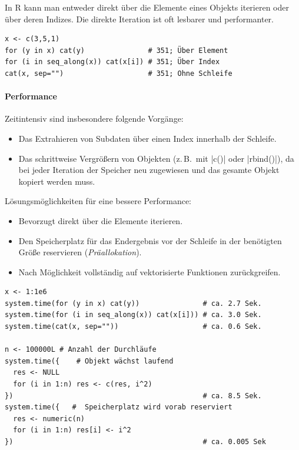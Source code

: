 \documentclass[10pt,twocolumn]{scrartcl}
\renewcommand{\lstinline}{\mycoloredinline}
\begin{document}
In R kann man entweder direkt über die Elemente eines Objekts iterieren oder über deren Indizes. Die direkte Iteration ist oft lesbarer und performanter.

\begin{lstlisting}
x <- c(3,5,1)
for (y in x) cat(y)               # 351; Über Element
for (i in seq_along(x)) cat(x[i]) # 351; Über Index
cat(x, sep="")                    # 351; Ohne Schleife
\end{lstlisting}


\paragraph{Performance}

Zeitintensiv sind insbesondere folgende Vorgänge:

\begin{itemize}
\item Das Extrahieren von Subdaten über einen Index innerhalb der Schleife.
\item Das schrittweise Vergrößern von Objekten (z.\,B.\ mit \lstinline|c()| oder \lstinline|rbind()|), da bei jeder Iteration der Speicher neu zugewiesen und das gesamte Objekt kopiert werden muss.
\end{itemize}

Lösungsmöglichkeiten für eine bessere Performance:

\begin{itemize}
\item Bevorzugt direkt über die Elemente iterieren.
\item Den Speicherplatz für das Endergebnis vor der Schleife in der benötigten Größe reservieren (\emph{Präallokation}).
\item Nach Möglichkeit vollständig auf vektorisierte Funktionen zurückgreifen.
\end{itemize}

\begin{lstlisting}
x <- 1:1e6
system.time(for (y in x) cat(y))               # ca. 2.7 Sek.
system.time(for (i in seq_along(x)) cat(x[i])) # ca. 3.0 Sek.
system.time(cat(x, sep=""))                    # ca. 0.6 Sek.

n <- 100000L # Anzahl der Durchläufe
system.time({    # Objekt wächst laufend
  res <- NULL
  for (i in 1:n) res <- c(res, i^2)
})                                             # ca. 8.5 Sek.
system.time({   #  Speicherplatz wird vorab reserviert
  res <- numeric(n)
  for (i in 1:n) res[i] <- i^2
})                                             # ca. 0.005 Sek
\end{lstlisting}
\end{document}
